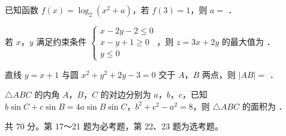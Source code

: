 \begin{question}
已知函数 $f(x)=\log_2\left(x^{2}+a\right)$，若 $f(3)=1$，则 $a=$ \gkblank{}．

\end{question}
\begin{question}
若 $x$，$y$ 满足约束条件 $\begin{cases}x-2y-2\le0\\ x-y+1\ge0\\ y\le0\end{cases}$，则 $z=3x+2y$ 的最大值为 \gkblank{}．

\end{question}
\begin{question}
直线 $y=x+1$ 与圆 $x^{2}+y^{2}+2y-3=0$ 交于 $A$，$B$ 两点，则 $|AB|=$ \gkblank{}．

\end{question}
\begin{question}
$\triangle ABC$ 的内角 $A$，$B$，$C$ 的对边分别为 $a$，$b$，$c$，已知 $b\sin C+c\sin B=4a\sin B\sin C$，$b^{2}+c^{2}-a^{2}=8$，则 $\triangle ABC$ 的面积为 \gkblank{}．

\par\medskip

\end{question}

\begin{gktip}
共 70 分。第 17～21 题为必考题，第 22、23 题为选考题。
\end{gktip}


